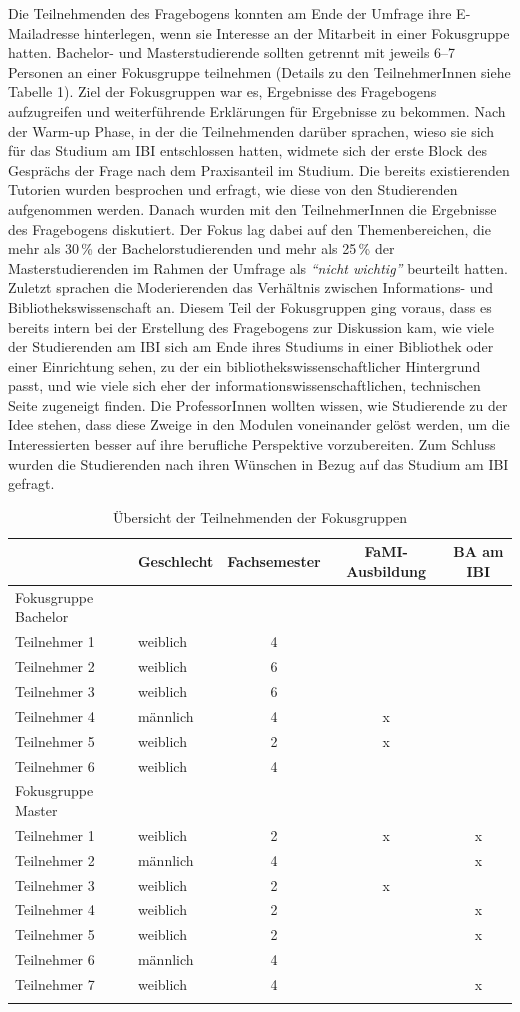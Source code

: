 \documentclass[a4paper,
fontsize=11pt,
oneside,
numbers=noperiodatend,
parskip=half-,
bibliography=totoc,
final
]{scrartcl}
\begin{document}
Die Teilnehmenden des Fragebogens konnten am Ende der Umfrage ihre
E-Mailadresse hinterlegen, wenn sie Interesse an der Mitarbeit in einer
Fokusgruppe hatten. Bachelor- und Masterstudierende sollten getrennt mit
jeweils 6--7 Personen an einer Fokusgruppe teilnehmen (Details zu den
TeilnehmerInnen siehe Tabelle 1). Ziel der Fokusgruppen war es,
Ergebnisse des Fragebogens aufzugreifen und weiterführende Erklärungen
für Ergebnisse zu bekommen. Nach der Warm-up Phase, in der die
Teilnehmenden darüber sprachen, wieso sie sich für das Studium am IBI
entschlossen hatten, widmete sich der erste Block des Gesprächs der
Frage nach dem Praxisanteil im Studium. Die bereits existierenden
Tutorien wurden besprochen und erfragt, wie diese von den Studierenden
aufgenommen werden. Danach wurden mit den TeilnehmerInnen die Ergebnisse
des Fragebogens diskutiert. Der Fokus lag dabei auf den Themenbereichen,
die mehr als 30\,\% der Bachelorstudierenden und mehr als 25\,\% der
Masterstudierenden im Rahmen der Umfrage als \emph{\enquote{nicht
wichtig}} beurteilt hatten. Zuletzt sprachen die Moderierenden das
Verhältnis zwischen Informations- und Bibliothekswissenschaft an. Diesem
Teil der Fokusgruppen ging voraus, dass es bereits intern bei der
Erstellung des Fragebogens zur Diskussion kam, wie viele der
Studierenden am IBI sich am Ende ihres Studiums in einer Bibliothek oder
einer Einrichtung sehen, zu der ein bibliothekswissenschaftlicher
Hintergrund passt, und wie viele sich eher der
informationswissenschaftlichen, technischen Seite zugeneigt finden. Die
ProfessorInnen wollten wissen, wie Studierende zu der Idee stehen, dass
diese Zweige in den Modulen voneinander gelöst werden, um die
Interessierten besser auf ihre berufliche Perspektive vorzubereiten. Zum
Schluss wurden die Studierenden nach ihren Wünschen in Bezug auf das
Studium am IBI gefragt.

\pagebreak

\begin{longtable}[]{@{}llccc@{}}
\toprule
& Geschlecht & Fachsemester & FaMI-Ausbildung & BA am IBI\tabularnewline
\midrule
\endhead
Fokusgruppe Bachelor & & & &\tabularnewline
\midrule
Teilnehmer 1 & weiblich & 4 & &\tabularnewline
Teilnehmer 2 & weiblich & 6 & &\tabularnewline
Teilnehmer 3 & weiblich & 6 & &\tabularnewline
Teilnehmer 4 & männlich & 4 & x &\tabularnewline
Teilnehmer 5 & weiblich & 2 & x &\tabularnewline
Teilnehmer 6 & weiblich & 4 & &\tabularnewline
\midrule
Fokusgruppe Master & & & &\tabularnewline
\midrule
Teilnehmer 1 & weiblich & 2 & x & x\tabularnewline
Teilnehmer 2 & männlich & 4 & & x\tabularnewline
Teilnehmer 3 & weiblich & 2 & x &\tabularnewline
Teilnehmer 4 & weiblich & 2 & & x\tabularnewline
Teilnehmer 5 & weiblich & 2 & & x\tabularnewline
Teilnehmer 6 & männlich & 4 & &\tabularnewline
Teilnehmer 7 & weiblich & 4 & & x\tabularnewline
\bottomrule
\caption{Übersicht der Teilnehmenden der Fokusgruppen}
\end{longtable}
\end{document}
